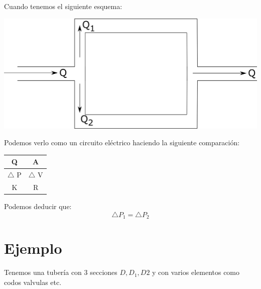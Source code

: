 \documentclass[10pt,a4paper]{article}
\begin{document}
Cuando tenemos el siguiente esquema:
\begin{center}
    \includegraphics[scale = 0.5]{Division.png}
\end{center}
Podemos verlo como un circuito eléctrico haciendo la siguiente comparación:
\begin{center}
\begin{tabular}{ |c|c| } 
 \hline
 Q & A \\ 
 \hline
 $\bigtriangleup$ P & $\bigtriangleup$ V \\ 
 \hline
 K & R \\ 
 \hline
\end{tabular}
\end{center}
Podemos deducir que:
$$
\bigtriangleup P_1 = \bigtriangleup P_2
$$

\section{Ejemplo}
Tenemos una tubería con 3 secciones $D, D_1, D2$ y con varios elementos como codos valvulas etc.
\end{document}
